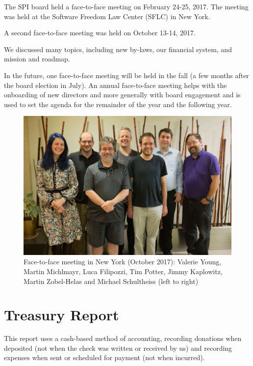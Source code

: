\documentclass[a4paper]{report}
\begin{document}
The SPI board held a face-to-face meeting on February 24-25, 2017.
The meeting was held at the Software Freedom Law Center (SFLC) in New
York.

A second face-to-face meeting was held on October 13-14, 2017.

We discussed many topics, including new by-laws, our financial system,
and mission and roadmap.

In the future, one face-to-face meeting will be held in the fall (a few
months after the board election in July).  An annual face-to-face
meeting helps with the onboarding of new directors and more generally
with board engagement and is used to set the agenda for the remainder
of the year and the following year.

\begin{figure}[h]
\centering

\includegraphics[scale=1.00]{images/2017-october-f2f}

\caption{Face-to-face meeting in New York (October 2017): Valerie Young,
Martin Michlmayr, Luca Filipozzi, Tim Potter, Jimmy Kaplowitz, Martin
Zobel-Helas and Michael Schultheiss (left to right)}

\end{figure}

\chapter{Treasury Report}

This report uses a cash-based method of accounting, recording donations when
deposited (not when the check was written or received by us) and recording
expenses when sent or scheduled for payment (not when incurred).
\end{document}
